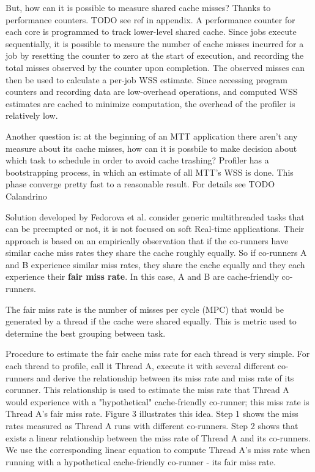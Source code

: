 \documentclass[a4paper,10pt]{article}
\begin{document}
\begin{multicols}{2}
But, how can it is possible to measure shared cache misses? Thanks to performance counters. TODO see ref in appendix.
A performance counter for each core is programmed to track lower-level shared cache. Since jobs execute sequentially, it is possible to measure the number
of cache misses incurred for a job by resetting the counter to zero at the start of execution, and recording the total misses observed by the counter
upon completion. The observed misses can then be used to calculate a per-job WSS estimate. Since accessing program counters and recording data
are low-overhead operations, and computed WSS estimates are cached to minimize computation, the overhead of the profiler is relatively low.

Another question is: at the beginning of an MTT application there aren't any measure about its cache misses, how can it is possbile to make decision
about which task to schedule in order to avoid cache trashing?
Profiler has a bootstrapping process, in which an estimate of all MTT's WSS is done. This phase converge pretty fast to a reasonable result.
For details see TODO Calandrino 

Solution developed by Fedorova et al. consider generic multithreaded tasks that can be preempted or not, it is not focused on soft Real-time applications.
Their approach is based on an empirically observation that if the co-runners have similar cache miss rates they share the cache
roughly equally. So if co-runners A and B experience similar miss rates, they share the cache equally and they each experience their
\textbf{fair miss rate}. In this case, A and B are cache-friendly co-runners.

The fair miss rate is the number of misses per cycle (MPC) that would be generated by a thread if the cache were shared equally. This is metric used
to determine the best grouping between task.

Procedure to estimate the fair cache miss rate for each thread is very simple.
For each thread to profile, call it Thread A, execute it with several different co-runners and derive the relationship between its miss rate and 
miss rate of its corunner. This relationship is used to estimate the miss rate that Thread A would experience with a "hypothetical" 
cache-friendly co-runner; this miss rate is Thread A's fair miss rate. Figure 3 illustrates this idea. Step 1 shows the miss rates measured as Thread A
runs with different co-runners. Step 2 shows that exists a linear relationship between the miss rate of Thread A and its co-runners.
We use the corresponding linear equation to compute Thread A's miss rate when running with a hypothetical cache-friendly co-runner - its fair miss 
rate.


\end{multicols}
\end{document}
